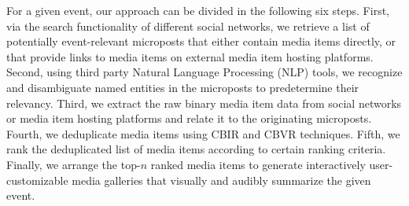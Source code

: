 \begin{abstracts}
For a given event, our approach can be divided in the following six steps.
First, via the search functionality of different social networks,
we retrieve a list of potentially event-relevant microposts
that either contain media items directly,
or that provide links to media items on external media item hosting platforms.
Second, using third party Natural Language Processing (NLP) tools,
we recognize and disambiguate named entities in the microposts to predetermine their relevancy.
Third, we extract the raw binary media item data from social networks or media item hosting platforms
and relate it to the originating microposts.
Fourth, we deduplicate media items using CBIR and CBVR techniques.
Fifth, we rank the deduplicated list of media items according to certain ranking criteria.
Finally, we arrange the top-$n$ ranked media items to generate
interactively user-customizable media galleries that visually and audibly summarize the given event.
\end{abstracts}

